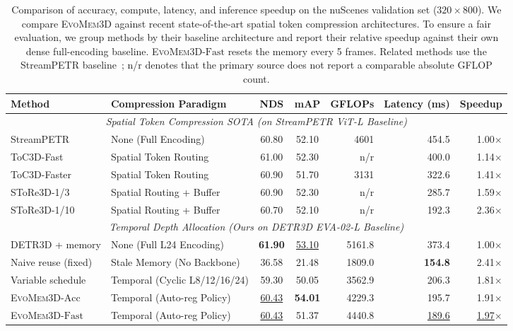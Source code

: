 \documentclass[10pt,twocolumn,letterpaper]{article}
\newcommand{\method}{\textsc{EvoMem3D}}
\begin{document}
\begin{table}[t]
\centering
\small
\caption{Comparison of accuracy, compute, latency, and inference speedup on the nuScenes validation set ($320\times800$). We compare \method{} against recent state-of-the-art spatial token compression architectures. To ensure a fair evaluation, we group methods by their baseline architecture and report their relative speedup against their own dense full-encoding baseline. \method{}-$\mathrm{Fast}$ resets the memory every 5 frames. Related methods use the StreamPETR baseline~\cite{wang2023streampetr}; n/r denotes that the primary source does not report a comparable absolute GFLOP count.}
\label{tab:main-results}
\begin{tabular}{llccrrr}
\toprule
Method & Compression Paradigm & NDS & mAP & GFLOPs & Latency (ms) & Speedup \\
\midrule
\multicolumn{7}{c}{\textit{Spatial Token Compression SOTA (on StreamPETR ViT-L Baseline)}} \\
\midrule
StreamPETR\cite{wang2023streampetr} & None (Full Encoding) & 60.80 & 52.10 & 4601 & 454.5 & 1.00$\times$ \\
ToC3D-Fast \cite{zhang2024toc3d} & Spatial Token Routing & 61.00 & 52.30 & n/r & 400.0 & 1.14$\times$ \\
ToC3D-Faster \cite{zhang2024toc3d} & Spatial Token Routing & 60.90 & 51.70 & 3131 & 322.6 & 1.41$\times$ \\
SToRe3D-1/3 \cite{store3d} & Spatial Routing + Buffer & 60.90 & 52.30 & n/r & 285.7 & 1.59$\times$ \\
SToRe3D-1/10 \cite{store3d} & Spatial Routing + Buffer & 60.70 & 52.10 & n/r & 192.3 & 2.36$\times$ \\
\midrule
\multicolumn{7}{c}{\textit{Temporal Depth Allocation (Ours on DETR3D EVA-02-L Baseline)}} \\
\midrule
DETR3D + memory & None (Full L24 Encoding) & \textbf{61.90} & \underline{53.10} & 5161.8 & 373.4 & 1.00$\times$ \\
Naive reuse (fixed) & Stale Memory (No Backbone) & 36.58 & 21.48 & 1809.0 & \textbf{154.8} & 2.41$\times$ \\
Variable schedule & Temporal (Cyclic L8/12/16/24) & 59.30 & 50.05 & 3562.9 & 206.3 & 1.81$\times$ \\
\midrule
\method{}-$\mathrm{Acc}$ & Temporal (Auto-reg Policy) & \underline{60.43} & \textbf{54.01} & 4229.3 & 195.7 & 1.91$\times$ \\
\method{}-$\mathrm{Fast}$ & Temporal (Auto-reg Policy) & \underline{60.43} & 51.37 & 4440.8 & \underline{189.6} & \underline{1.97$\times$} \\
\bottomrule
\end{tabular}
\end{table}
\end{document}
